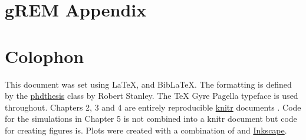 
\appendix
\chapter{gREM Appendix}
\label{appendixlabel1}




\chapter{Colophon}
\label{appendixlabel3}

This document was set using \LaTeX, \XeLaTeX\vspace{1mm} and Bib\LaTeX.
The formatting is defined by the \href{https://github.com/robjstan/latex-phdthesis}{phdthesis} class by Robert Stanley.
The TeX Gyre Pagella typeface is used throughout.
Chapters 2, 3 and 4 are entirely reproducible \href{http://yihui.name/knitr/}{knitr} documents \cite{knitr}.
Code for the simulations in Chapter 5 is not combined into a knitr document but code for creating figures is.
Plots were created with a combination of \cite{ggplot2, palettetown, ggtree} and \href{www.inkscape.org}{Inkscape}.

